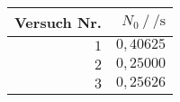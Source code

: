 \begin{tabular}{rr}
	\toprule
	Versuch Nr. & $N_0 ~/~ \si{\per\second}$\\
	\midrule
	$1$ & $0{,}40625$\\
	$2$ & $0{,}25000$\\
	$3$ & $0{,}25626$\\
	\bottomrule
\end{tabular}